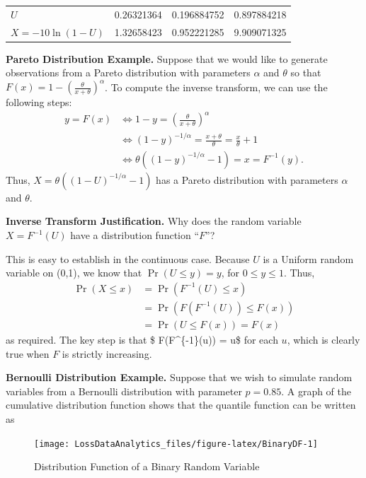 \documentclass[]{book}
\theoremstyle{definition}
\theoremstyle{definition}
\theoremstyle{definition}
\theoremstyle{remark}
\begin{document}
\begin{longtable}[]{@{}lrrr@{}}
\toprule
\(U\) & 0.26321364 & 0.196884752 & 0.897884218\tabularnewline
\(X = -10\ln(1-U)\) & 1.32658423 & 0.952221285 &
9.909071325\tabularnewline
\bottomrule
\end{longtable}

\textbf{Pareto Distribution Example.} Suppose that we would like to
generate observations from a Pareto distribution with parameters
\(\alpha\) and \(\theta\) so that
\(F(x) = 1 - \left(\frac{\theta}{x+\theta} \right)^{\alpha}\). To
compute the inverse transform, we can use the following steps:
\[\begin{aligned}
 y = F(x) &\Leftrightarrow 1-y = \left(\frac{\theta}{x+\theta} \right)^{\alpha} \\
  &\Leftrightarrow \left(1-y\right)^{-1/\alpha} = \frac{x+\theta}{\theta} = \frac{x}{\theta} +1 \\
    &\Leftrightarrow \theta \left((1-y)^{-1/\alpha} - 1\right) = x = F^{-1}(y) .\end{aligned}\]
Thus, \(X = \theta \left((1-U)^{-1/\alpha} - 1\right)\) has a Pareto
distribution with parameters \(\alpha\) and \(\theta\).

\textbf{Inverse Transform Justification.} Why does the random variable
\(X = F^{-1}(U)\) have a distribution function ``\(F\)''?

This is easy to establish in the continuous case. Because \(U\) is a
Uniform random variable on (0,1), we know that \(\Pr(U \le y) = y\), for
\(0 \le y \le 1\). Thus, \[\begin{aligned}
\Pr(X \le x) &= \Pr(F^{-1}(U) \le x) \\
 &= \Pr(F(F^{-1}(U)) \le F(x)) \\
&= \Pr(U \le F(x)) = F(x)\end{aligned}\] as required. The key step is
that \$ F(F\^{}\{-1\}(u)) = u\$ for each \(u\), which is clearly true
when \(F\) is strictly increasing.

\textbf{Bernoulli Distribution Example.} Suppose that we wish to
simulate random variables from a Bernoulli distribution with parameter
\(p=0.85\). A graph of the cumulative distribution function shows that
the quantile function can be written as

\begin{figure}

{\centering \texttt{[image: LossDataAnalytics\_files/figure-latex/BinaryDF-1]} 

}

\caption{Distribution Function of a Binary Random Variable}\label{fig:BinaryDF}
\end{figure}
\end{document}
